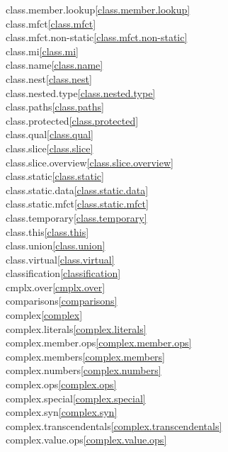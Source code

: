 \begin{multicols}{2}
class.member.lookup\quad\ref{class.member.lookup}\\
class.mfct\quad\ref{class.mfct}\\
class.mfct.non-static\quad\ref{class.mfct.non-static}\\
class.mi\quad\ref{class.mi}\\
class.name\quad\ref{class.name}\\
class.nest\quad\ref{class.nest}\\
class.nested.type\quad\ref{class.nested.type}\\
class.paths\quad\ref{class.paths}\\
class.protected\quad\ref{class.protected}\\
class.qual\quad\ref{class.qual}\\
class.slice\quad\ref{class.slice}\\
class.slice.overview\quad\ref{class.slice.overview}\\
class.static\quad\ref{class.static}\\
class.static.data\quad\ref{class.static.data}\\
class.static.mfct\quad\ref{class.static.mfct}\\
class.temporary\quad\ref{class.temporary}\\
class.this\quad\ref{class.this}\\
class.union\quad\ref{class.union}\\
class.virtual\quad\ref{class.virtual}\\
classification\quad\ref{classification}\\
cmplx.over\quad\ref{cmplx.over}\\
comparisons\quad\ref{comparisons}\\
complex\quad\ref{complex}\\
complex.literals\quad\ref{complex.literals}\\
complex.member.ops\quad\ref{complex.member.ops}\\
complex.members\quad\ref{complex.members}\\
complex.numbers\quad\ref{complex.numbers}\\
complex.ops\quad\ref{complex.ops}\\
complex.special\quad\ref{complex.special}\\
complex.syn\quad\ref{complex.syn}\\
complex.transcendentals\quad\ref{complex.transcendentals}\\
complex.value.ops\quad\ref{complex.value.ops}\\

\end{multicols}
